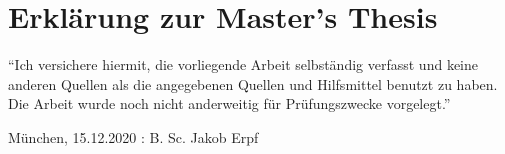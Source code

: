 \cleardoubleoddpage	
\chapter*{Erklärung zur Master’s Thesis}
\thispagestyle{empty} %

\enquote{Ich versichere hiermit, die vorliegende Arbeit selbständig verfasst und keine anderen Quellen als die angegebenen Quellen und Hilfsmittel benutzt zu haben. Die Arbeit wurde noch nicht anderweitig für Prüfungszwecke vorgelegt.}

\vspace{4cm}

München, 15.12.2020 : \hrulefill \newline
\hspace*{0mm}\phantom{München, 11.12.2020: } B. Sc. Jakob Erpf
